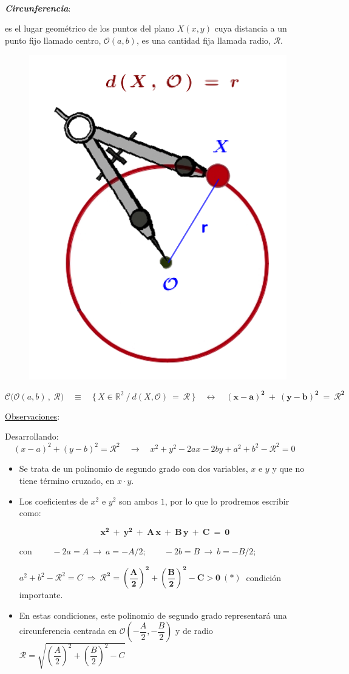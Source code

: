 \begin{definition}[ Circunferencia]

\begin{multicols}{2}
$\quad$ 

\textbf{\emph{Circunferencia}}: 

\vspace{4mm}es el lugar geométrico de los puntos del plano $X(x,y)$ cuya distancia a un punto fijo llamado centro, $\mathcal O(a,b)$, es una cantidad fija llamada radio,  $\mathcal R$.

\begin{figure}[H]
	\centering
	\includegraphics[width=.25\textwidth]{img-conicas/conicas20.png}
	\end{figure}
\end{multicols}
\vspace{-10mm}
$$\mathcal C \Big( \mathcal O(a,b)\, ,\  \mathcal R \Big)  \quad \equiv \quad \Big\{\,  X \in \mathbb R^2 \ \big/ \ d(X,\mathcal O)\ = \ \mathcal R \, \Big\}  \quad \leftrightarrow \quad \boldsymbol{ (x-a)^2 \ + \ (y-b)^2 \ = \ \mathcal R^2}$$
	
\end{definition}

\underline{Observaciones}:

Desarrollando: $\quad (x-a)^2+(y-b)^2=\mathcal R^2 \quad \longrightarrow \quad x^2+y^2-2ax-2by+a^2+b^2-\mathcal R^2=0$

\begin{itemize}

\item Se trata de un polinomio de segundo grado con dos variables, $x$ e $y$ y que no tiene término cruzado, en $x\cdot y$.
\item Los coeficientes de $x^2$ e $y^2$ son ambos $1$, por lo que lo prodremos escribir como:

$$ \boldsymbol{ x^2 \ + \ y^2\ + \ A\, x \ + \ B\, y \ + \ C \ = \ 0 }$$

con $\qquad -2a=A \ \to \ a=-A/2;\qquad -2b=B \ \to \ b=-B/2; \qquad $

$a^2+b^2-\mathcal R^2=C \ \Rightarrow \ \boldsymbol{ \mathcal R^2=\left( \dfrac A 2 \right)^2+\left( \dfrac B 2 \right)^2-C > 0 } \ (*)\ $ condición importante.

\item En estas condiciones, este polinomio de segundo grado representará una circunferencia centrada en $\mathcal O \left( -\dfrac A 2 ,- \dfrac B 2 \right)$ y de radio $\mathcal R=\sqrt{\left( \dfrac A 2 \right)^2+\left( \dfrac B 2 \right)^2-C }$	
\end{itemize}

